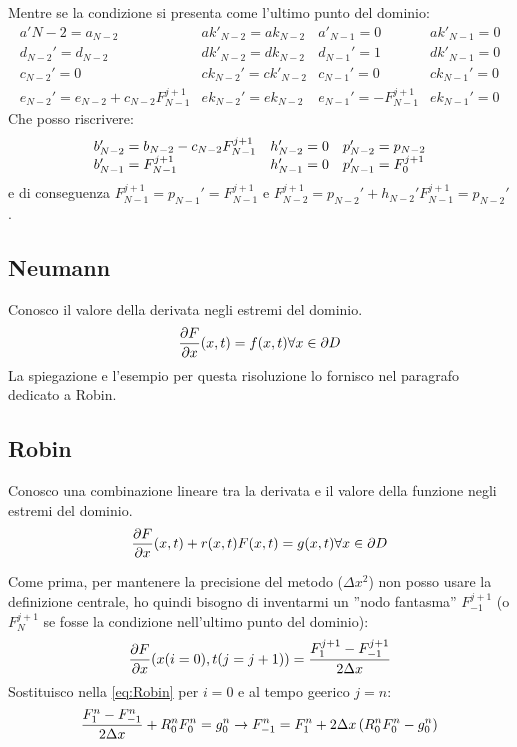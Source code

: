 Mentre se la condizione si presenta come l'ultimo punto del dominio:
\begin{equation}
  \begin{array}{ll|ll}
    a'{N-2} = a_{N-2}	& ak'_{N-2}= ak_{N-2}	&	a'_{N-1} = 0	& ak'_{N-1}= 0\\
    d_{N-2}' = d_{N-2}	& dk'_{N-2} = dk_{N-2}	&	d_{N-1}' = 1	& dk'_{N-1} = 0\\
    c_{N-2}' =  0		& ck_{N-2}' = ck'_{N-2}	&	c_{N-1}' =  0	& ck_{N-1}' = 0\\
    e_{N-2}' = e_{N-2}+c_{N-2}F_{N-1}^{j+1} & ek_{N-2}' = ek_{N-2}	&	e_{N-1}' =  -F^{j+1}_{N-1} & ek_{N-1}' = 0
  \end{array}
\end{equation}
Che posso riscrivere:
\begin{equation}
  \begin{array}{l l l}
    b_{N-2}' = b_{N-2} - c_{N-2} F_{N-1}^{j+1}  &h_{N-2}' = 0&p_{N-2}' = p_{N-2}\\
    b_{N-1}' = F_{N-1}^{j+1}&h_{N-1}' = 0&p_{N-1}' = F_0^{j+1}
  \end{array}
\end{equation}
e di conseguenza $F_{N-1}^{j+1} = p_{N-1}' = F_{N-1}^{j+1}$ e $F_{N-2}^{j+1} = p_{N-2}'+h_{N-2}' F_{N-1}^{j+1} =  p_{N-2}'$.

\subsection{Neumann}
Conosco il valore della derivata negli estremi del dominio.
\begin{equation}
  \frac{\partial F}{\partial x}(x,t) = f(x,t) \forall x \in \partial D
\end{equation}
La spiegazione e l'esempio per questa risoluzione lo fornisco nel paragrafo dedicato a Robin.

\subsection{Robin}
Conosco una combinazione lineare tra la derivata e il valore della funzione negli estremi del dominio.
\begin{equation}\label{eq:Robin}
  \frac{\partial F}{\partial x}(x,t) +r(x,t) F(x,t) = g(x,t) \forall x \in \partial D
\end{equation}

Come prima, per mantenere la precisione del metodo ($\Delta x^2$) non posso usare la definizione  centrale,  ho quindi bisogno di inventarmi un ''nodo fantasma'' $F_{-1}^{j+1}$ (o $F_{N}^{j+1}$ se fosse la condizione nell'ultimo punto del dominio):
\begin{equation}
  \frac{\partial F}{\partial x}(x(i=0),t(j=j+1)) = \frac{F_{1}^{j+1}-F_{-1}^{j+1}}{2\Delta x}
\end{equation}
Sostituisco nella \eqref{eq:Robin} per $i=0$ e al tempo geerico $j=n$:
\begin{equation}
  \frac{F_{1}^{n}-F_{-1}^{n}}{2\Delta x} + R_0^nF_{0}^{n} = g_0^n  \to 
  F_{-1}^{n} = F_{1}^{n} + 2\Delta x \left( R_0^nF_{0}^{n}-g^n_0 \right)
\end{equation}

